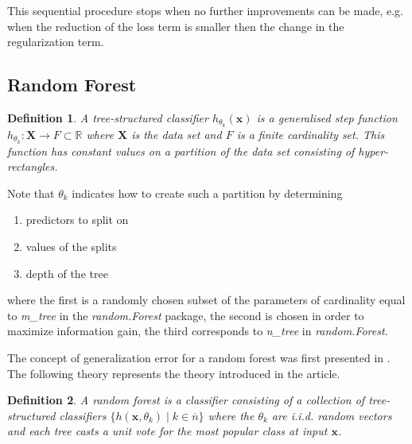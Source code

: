 \documentclass[a4paper,12pt]{article}
\newtheorem{definition}{Definition}[section]
\begin{document}
This sequential procedure stops when no further improvements can be made, e.g. when the reduction of the loss term is smaller then the change in the regularization term. \\

\subsection{Random Forest}

\begin{definition}
A tree-structured classifier $h_{\theta_{k} }(\textbf{x})$ is a generalised step function $h_{\theta_{k} }: \textbf{X} \rightarrow F \subset \mathbb{R}$ where $\textbf{X}$ is the data set and $F$ is a finite cardinality set. This function has constant values on a partition of the data set consisting of hyper-rectangles.
\end{definition}
Note that $\theta_{k}$ indicates how to create such a partition by determining 
\begin{enumerate}
\item predictors to split on
\item values of the splits
\item depth of the tree
\end{enumerate}
where the first is a randomly chosen subset of the parameters of cardinality equal to \textit{m\_tree} in the \textit{random.Forest} package, the second is chosen in order to maximize information gain, the third corresponds to \textit{n\_tree} in \textit{random.Forest}. 

The concept of generalization error for a random forest was first presented in \cite{breiman2001random}. The following theory represents the theory introduced in the article. 

\begin{definition}
A random forest is a classifier consisting of a collection of tree-structured classifiers $\{h( \textbf{x},  \theta_{k} ) \mid k \in  \overline{n} \}$ where the $\theta_{k}$ are i.i.d. random vectors and each tree casts a unit vote for the most popular class at input $\textbf{x}$.
\end{definition}
\end{document}
